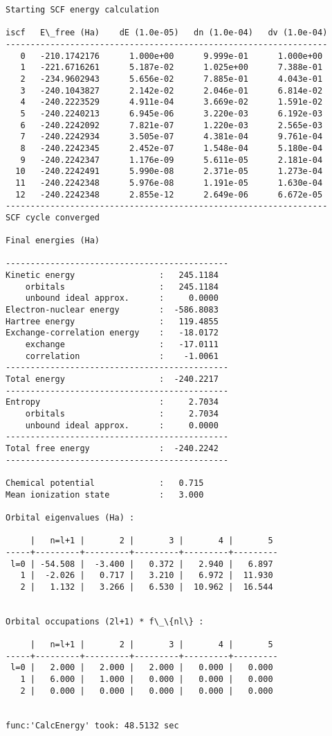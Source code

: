 \documentclass[11pt]{article}
\begin{document}
    \begin{Verbatim}[commandchars=\\\{\}]
Starting SCF energy calculation

iscf   E\_free (Ha)    dE (1.0e-05)   dn (1.0e-04)   dv (1.0e-04)
-----------------------------------------------------------------
   0   -210.1742176      1.000e+00      9.999e-01      1.000e+00
   1   -221.6716261      5.187e-02      1.025e+00      7.388e-01
   2   -234.9602943      5.656e-02      7.885e-01      4.043e-01
   3   -240.1043827      2.142e-02      2.046e-01      6.814e-02
   4   -240.2223529      4.911e-04      3.669e-02      1.591e-02
   5   -240.2240213      6.945e-06      3.220e-03      6.192e-03
   6   -240.2242092      7.821e-07      1.220e-03      2.565e-03
   7   -240.2242934      3.505e-07      4.381e-04      9.761e-04
   8   -240.2242345      2.452e-07      1.548e-04      5.180e-04
   9   -240.2242347      1.176e-09      5.611e-05      2.181e-04
  10   -240.2242491      5.990e-08      2.371e-05      1.273e-04
  11   -240.2242348      5.976e-08      1.191e-05      1.630e-04
  12   -240.2242348      2.855e-12      2.649e-06      6.672e-05
-----------------------------------------------------------------
SCF cycle converged

Final energies (Ha)

---------------------------------------------
Kinetic energy                 :   245.1184
    orbitals                   :   245.1184
    unbound ideal approx.      :     0.0000
Electron-nuclear energy        :  -586.8083
Hartree energy                 :   119.4855
Exchange-correlation energy    :   -18.0172
    exchange                   :   -17.0111
    correlation                :    -1.0061
---------------------------------------------
Total energy                   :  -240.2217
---------------------------------------------
Entropy                        :     2.7034
    orbitals                   :     2.7034
    unbound ideal approx.      :     0.0000
---------------------------------------------
Total free energy              :  -240.2242
---------------------------------------------

Chemical potential             :   0.715
Mean ionization state          :   3.000

Orbital eigenvalues (Ha) :

     |   n=l+1 |       2 |       3 |       4 |       5
-----+---------+---------+---------+---------+---------
 l=0 | -54.508 |  -3.400 |   0.372 |   2.940 |   6.897
   1 |  -2.026 |   0.717 |   3.210 |   6.972 |  11.930
   2 |   1.132 |   3.266 |   6.530 |  10.962 |  16.544


Orbital occupations (2l+1) * f\_\{nl\} :

     |   n=l+1 |       2 |       3 |       4 |       5
-----+---------+---------+---------+---------+---------
 l=0 |   2.000 |   2.000 |   2.000 |   0.000 |   0.000
   1 |   6.000 |   1.000 |   0.000 |   0.000 |   0.000
   2 |   0.000 |   0.000 |   0.000 |   0.000 |   0.000


func:'CalcEnergy' took: 48.5132 sec
    \end{Verbatim}
\end{document}
